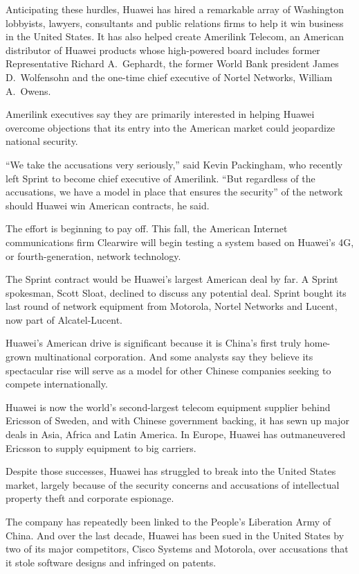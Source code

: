 ﻿\documentclass[12pt]{article}
\begin{document}
Anticipating these hurdles, Huawei has hired a remarkable array of Washington lobbyists, lawyers,
consultants and public relations firms to help it win business in the United States. It has also
helped create Amerilink Telecom, an American distributor of Huawei products whose high-powered board
includes former Representative Richard A.~Gephardt, the former World Bank president James
D.~Wolfensohn and the one-time chief executive of Nortel Networks, William A.~Owens.

Amerilink executives say they are primarily interested in helping Huawei overcome objections that
its entry into the American market could jeopardize national security.

``We take the accusations very seriously,'' said Kevin Packingham, who recently left Sprint to
become chief executive of Amerilink. ``But regardless of the accusations, we have a model in place
that ensures the security'' of the network should Huawei win American contracts, he said.

The effort is beginning to pay off. This fall, the American Internet communications firm Clearwire
will begin testing a system based on Huawei's 4G, or fourth-generation, network technology.

The Sprint contract would be Huawei's largest American deal by far. A Sprint spokesman, Scott Sloat,
declined to discuss any potential deal. Sprint bought its last round of network equipment from
Motorola, Nortel Networks and Lucent, now part of Alcatel-Lucent.

Huawei's American drive is significant because it is China's first truly home-grown multinational
corporation. And some analysts say they believe its spectacular rise will serve as a model for other
Chinese companies seeking to compete internationally.

Huawei is now the world's second-largest telecom equipment supplier behind Ericsson of Sweden, and
with Chinese government backing, it has sewn up major deals in Asia, Africa and Latin America. In
Europe, Huawei has outmaneuvered Ericsson to supply equipment to big carriers.

Despite those successes, Huawei has struggled to break into the United States market, largely
because of the security concerns and accusations of intellectual property theft and corporate
espionage.

The company has repeatedly been linked to the People's Liberation Army of China. And over the last
decade, Huawei has been sued in the United States by two of its major competitors, Cisco Systems and
Motorola, over accusations that it stole software designs and infringed on patents.
\end{document}
